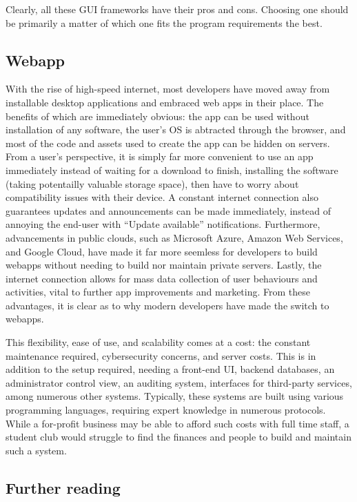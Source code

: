 \documentclass[11pt]{article}
\begin{document}
Clearly, all these GUI frameworks have their pros and cons. Choosing one should be primarily a matter of which one fits the program requirements the best.

\subsection{Webapp}

With the rise of high-speed internet, most developers have moved away from installable desktop applications and embraced web apps in their place. The benefits of which are immediately obvious: the app can be used without installation of any software, the user's OS is abtracted through the browser, and most of the code and assets used to create the app can be hidden on servers. From a user's perspective, it is simply far more convenient to use an app immediately instead of waiting for a download to finish, installing the software (taking potentailly valuable storage space), then have to worry about compatibility issues with their device. A constant internet connection also guarantees updates and announcements can be made immediately, instead of annoying the end-user with ``Update available'' notifications. Furthermore, advancements in public clouds, such as Microsoft Azure, Amazon Web Services, and Google Cloud, have made it far more seemless for developers to build webapps without needing to build nor maintain private servers. Lastly, the internet connection allows for mass data collection of user behaviours and activities, vital to further app improvements and marketing. From these advantages, it is clear as to why modern developers have made the switch to webapps.

This flexibility, ease of use, and scalability comes at a cost: the constant maintenance required, cybersecurity concerns, and server costs. This is in addition to the setup required, needing a front-end UI, backend databases, an administrator control view, an auditing system, interfaces for third-party services, among numerous other systems. Typically, these systems are built using various programming languages, requiring expert knowledge in numerous protocols. While a for-profit business may be able to afford such costs with full time staff, a student club would struggle to find the finances and people to build and maintain such a system.

\subsection{Further reading}
\end{document}
